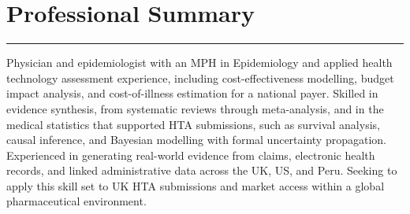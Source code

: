 \section{Professional Summary}
\vspace{-1.5em}
\textcolor{darkgray}{\rule{\textwidth}{0.5pt}}
Physician and epidemiologist with an MPH in Epidemiology and applied health
technology assessment experience, including cost-effectiveness modelling, budget
impact analysis, and cost-of-illness estimation for a national payer. Skilled in
evidence synthesis, from systematic reviews through
meta-analysis, and in the medical statistics that supported HTA submissions, such as
survival analysis, causal inference, and Bayesian modelling
with formal uncertainty propagation. Experienced in generating real-world
evidence from claims, electronic health records, and linked administrative data
across the UK, US, and Peru. Seeking to apply this skill set to UK HTA
submissions and market access within a global pharmaceutical environment.
